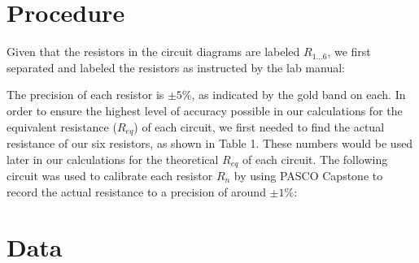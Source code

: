 \documentclass[12pt,letterpaper,titlepage]{report}
\begin{document}

\bigskip
\section*{Procedure}

Given that the resistors in the circuit diagrams are labeled $R_{1\ldots6}$, we first separated and labeled the resistors as instructed by the lab manual:

\bigskip
\begin{minipage}{\linewidth}
\centering

\end{minipage}
\bigskip

The precision of each resistor is $\pm 5 \%$, as indicated by the gold band on each. In order to ensure the highest level of accuracy possible in our calculations for the equivalent resistance ($R_{eq}$) of each circuit, we first needed to find the actual resistance of our six resistors, as shown in Table 1. These numbers would be used later in our calculations for the theoretical $R_{eq}$ of each circuit. The following circuit was used to calibrate each resistor $R_n$ by using PASCO Capstone to record the actual resistance to a precision of around $\pm 1 \%$:

\bigskip
\begin{minipage}{\linewidth}
\centering

\end{minipage}
\bigskip




\bigskip
\section*{Data}


\begin{minipage}{\linewidth}
\centering
{}

\end{minipage}

\bigskip
\bigskip

\begin{minipage}{\linewidth}
\centering
{}

\end{minipage}

\bigskip
\bigskip

\begin{minipage}{\linewidth}
\centering
{}

\end{minipage}
\end{document}
